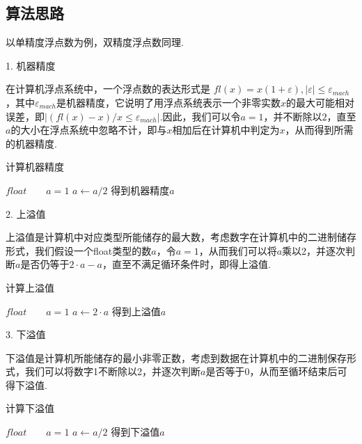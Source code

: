\documentclass[UTF8,ctexart,a4paper,11pt,openany]{article}
\theoremstyle{definition}
\newcommand\e{\leftarrow}
\begin{document}
    \subsection{算法思路}
    以单精度浮点数为例，双精度浮点数同理.\par
    1. 机器精度\par
    在计算机浮点系统中，一个浮点数的表达形式是 $fl(x)=x(1+\varepsilon),\left|\varepsilon\right| \leqslant \varepsilon_{mach}$，其中$\varepsilon_{mach}$是机器精度，它说明了用浮点系统表示一个非零实数$x$的最大可能相对误差，即$|(fl(x)-x)/x \leqslant\varepsilon_{mach}|$.因此，我们可以令$a=1$，并不断除以$2$，直至$a$的大小在浮点系统中忽略不计，即与$x$相加后在计算机中判定为$x$，从而得到所需的机器精度.
    \begin{algorithm}
        \caption{计算机器精度}
        \begin{algorithmic}[1]
            \State $float \qquad a=1$
                \State $a \e a/2$
            \EndWhile
            \State 得到机器精度$a$
        \end{algorithmic}
    \end{algorithm}
    \par
    2. 上溢值 \par
    上溢值是计算机中对应类型所能储存的最大数，考虑数字在计算机中的二进制储存形式，我们假设一个float类型的数$a$，令$a=1$，从而我们可以将$a$乘以2，并逐次判断$a$是否仍等于$2\cdot a-a$，直至不满足循环条件时，即得上溢值.
    \begin{algorithm}
        \caption{计算上溢值}
        \begin{algorithmic}[1]
            \State $float \qquad a=1$
            \State $a \e 2\cdot a$
            \EndWhile
            \State 得到上溢值$a$
        \end{algorithmic}
    \end{algorithm}
    \par
    3. 下溢值\par
    下溢值是计算机所能储存的最小非零正数，考虑到数据在计算机中的二进制保存形式，我们可以将数字1不断除以2，并逐次判断$a$是否等于0，从而至循环结束后可得下溢值.
    \begin{algorithm}[H]
        \caption{计算下溢值}
        \begin{algorithmic}[1]
            \State $float \qquad a=1$
            \State $a \e a/2$
            \EndWhile
            \State 得到下溢值$a$
        \end{algorithmic}
    \end{algorithm}
\end{document}
